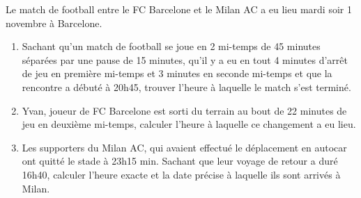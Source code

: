 \begin{exercice}[Football]
Le match de football entre le FC Barcelone et le Milan AC a eu lieu mardi soir 1 novembre à Barcelone. 
\begin{enumerate}
 \item Sachant qu’un match de football se joue en 2 mi-temps de 45 minutes séparées par une pause de 15 minutes, qu’il y a eu en tout 4 minutes d’arrêt de jeu en première mi-temps et 3 minutes en seconde mi-temps et que la rencontre a débuté à 20h45, trouver l’heure à laquelle le match s’est terminé. 
 \item Yvan, joueur de FC Barcelone est sorti du terrain au bout de 22 minutes de jeu en deuxième mi-temps, calculer l’heure à laquelle ce changement a eu lieu.
 \item Les supporters du Milan AC, qui avaient effectué le déplacement en autocar ont quitté le stade à 23h15 min. Sachant que leur voyage de retour a duré 16h40, calculer l’heure exacte et la date précise à laquelle ils sont arrivés à Milan. 
 \end{enumerate}
\end{exercice}
